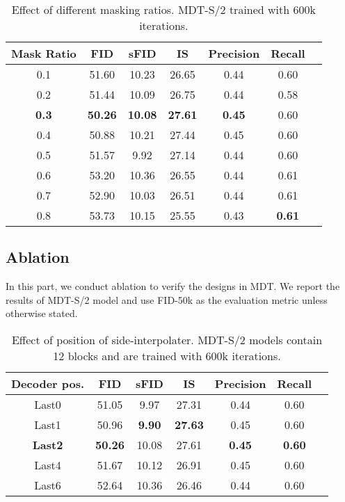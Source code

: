 \documentclass[final]{cvpr}
\begin{document}
\begin{table}[t!]
\centering
\small
\setlength{\tabcolsep}{1.8mm} \begin{tabular}{ccccccc}
    \toprule
    Mask Ratio	 &  FID & sFID & IS & Precision & Recall \\	\midrule
    0.1 & 51.60 & 10.23 & 26.65 & 0.44 & 0.60   \\
    0.2 & 51.44 & 10.09 & 26.75 & 0.44 & 0.58    \\
    \textbf{0.3} & \textbf{50.26} & \textbf{10.08} & \textbf{27.61} & \textbf{0.45} & 0.60   \\
    0.4 & 50.88 & 10.21 & 27.44 & 0.45 & 0.60  \\
    0.5 & 51.57 & 9.92  & 27.14 & 0.44 & 0.60  \\
    0.6 & 53.20 & 10.36 & 26.55 & 0.44 & 0.61   \\
    0.7 & 52.90 & 10.03 & 26.51 & 0.44 & 0.61 \\
    0.8 & 53.73 & 10.15 & 25.55 & 0.43 & \textbf{0.61} \\
    \bottomrule
\end{tabular}
\vspace{2pt}
\caption{Effect of different masking ratios. MDT-S/2 trained with 600k iterations. 
}
\label{tab:maskratio}
\end{table}

\subsection{Ablation}
\label{sec:abl}
In this part, we conduct ablation to verify the designs in MDT.
We report the results of MDT-S/2 model and use FID-50k as the evaluation
metric unless otherwise stated.

\begin{table}[!t]
    \centering
    \small
    \setlength{\tabcolsep}{1.7mm} \begin{tabular}{ccccccc}
        \toprule
        Decoder pos.	 &  FID & sFID & IS & Precision & Recall \\	\midrule
        Last0  & 51.05 & 9.97 & 27.31 & 0.44 & 0.60 \\
        Last1  &  50.96 & \textbf{9.90} & \textbf{27.63}  & 0.45 & 0.60 \\
        \textbf{Last2} & \textbf{50.26} & 10.08 & 27.61 & \textbf{0.45} & \textbf{0.60}   \\
        Last4  & 51.67 & 10.12 & 26.91  & 0.45 & 0.60 \\
        Last6  & 52.64 & 10.36 & 26.46  & 0.44 & 0.60 \\
        \bottomrule
    \end{tabular}
    \vspace{2pt}
    \caption{Effect of position of side-interpolater. 
    MDT-S/2 models contain 12 blocks and are trained with 600k iterations.
    \label{tab:decoder_pos}
    }
    \end{table}
\end{document}
